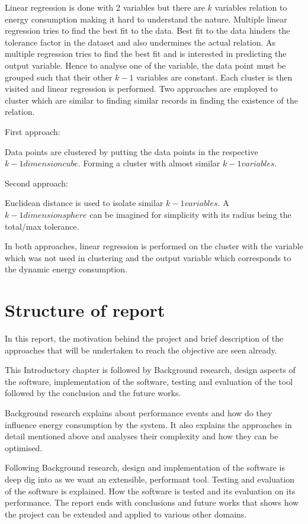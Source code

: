 Linear regression is done with 2 variables but there are \(k\) variables relation to energy consumption making it hard to understand the nature. Multiple linear regression tries to find the best fit to the data. Best fit to the data hinders the tolerance factor in the dataset and also undermines the actual relation. As multiple regression tries to find the best fit and is interested in predicting the output variable. Hence to analyse one of the variable, the data point must be grouped such that their other \(k-1\) variables are constant. Each cluster is then visited and linear regression is performed. Two approaches are employed to cluster which are similar to finding similar records in finding the existence of the relation.

First approach:

Data points are clustered by putting the data points in the respective \(k-1 dimension cube\). Forming a cluster with almost similar \(k-1 variables\).

Second approach:

Euclidean distance is used to isolate similar \(k-1 variables\). A \(k-1 dimension sphere\) can be imagined for simplicity with its radius being the total/max tolerance.

In both approaches, linear regression is performed on the cluster with the variable which was not used in clustering and the output variable which corresponds to the dynamic energy consumption.

\section{Structure of report}

In this report, the motivation behind the project and brief description of the approaches that will be undertaken to reach the objective are seen already.

This Introductory chapter is followed by Background research, design aspects of the software, implementation of the software, testing and evaluation of the tool followed by the conclusion and the future works.

Background research explains about performance events and how do they influence energy consumption by the system. It also explains the approaches in detail mentioned above and analyses their complexity and how they can be optimised.

Following Background research, design and implementation of the software is deep dig into as we want an extensible, performant tool. Testing and evaluation of the software is explained. How the software is tested and its evaluation on its performance. The report ends with conclusions and future works that shows how the project can be extended and applied to various other domains.